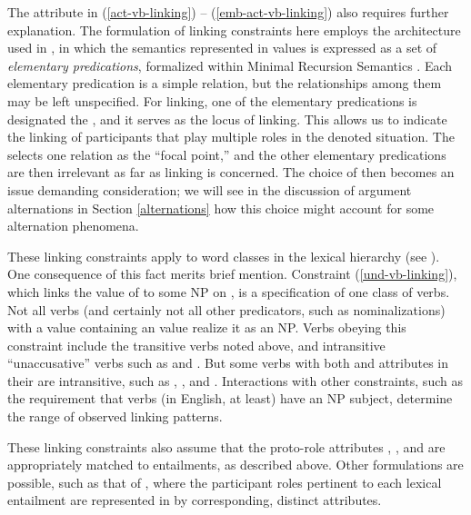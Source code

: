\documentclass[output=paper
                ,modfonts
                ,nonflat
	        ,collection
	        ,collectionchapter
	        ,collectiontoclongg
 	        ,biblatex
                ,babelshorthands
                ,newtxmath
                ,draftmode
                ,colorlinks, citecolor=brown
]{./langsci/langscibook}
\begin{document}
The  attribute in (\ref{act-vb-linking}) -- (\ref{emb-act-vb-linking}) also requires further explanation.
The formulation of linking constraints here employs the architecture used in \citet{KoenigandDavis2006}, in which the semantics represented in \content values is expressed as a set of \emph{elementary predications}, formalized within Minimal Recursion Semantics \citep{Copestakeetal2001,Copestakeetal2005}.
Each elementary predication is a simple relation, but the relationships among them may be left unspecified.
For linking, one of the elementary predications is designated the , and it serves as the locus of linking.
This allows us to %
indicate the linking of participants that play multiple roles in the denoted situation. 
The  selects one relation as the ``focal point,'' and the other elementary predications are then irrelevant as far as linking is concerned. 
The choice of  then becomes an issue demanding consideration; we will see in the discussion of argument alternations  in Section \ref{alternations} how this choice might account for some alternation phenomena.

These linking constraints apply to word classes in the lexical hierarchy
 (see ).
One consequence of this fact merits brief mention.
Constraint (\ref{und-vb-linking}), which links the value of  to some NP on \argst, is a specification of one class of verbs.
Not all verbs (and certainly not all other predicators, such as nominalizations) with a \content value containing an  value realize it as an NP.
Verbs obeying this constraint include the transitive verbs noted above, and intransitive ``unaccusative'' verbs such as  and .
But some verbs with both  and  attributes in their \content are intransitive, such as , , and .
Interactions with other constraints, such as the requirement that verbs (in English, at least) have an NP subject, determine the range of observed linking patterns.

These linking constraints also assume that the proto-role  attributes , , and  are appropriately matched to entailments, as described above.
Other formulations are possible, such as that of \citet{KoenigandDavis2003}, where the participant roles  pertinent to each lexical entailment are represented in \content by corresponding, distinct attributes.
\end{document}
